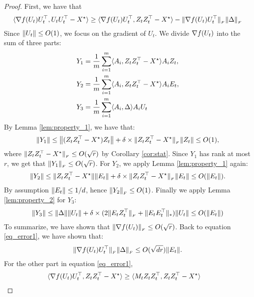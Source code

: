	\begin{proof}
		First, we have that
		\begin{align}
			\langle\nabla f(U_t) U_t^{\top}, U_tU_t^{\top} - {X}^\star\rangle
			\ge \langle\nabla f(U_t) U_t^{\top}, Z_tZ_t^{\top} - {X}^\star\rangle - \|\nabla f(U_t) U_t^{\top}\|_{_{F}} \|\Delta\|_{_{F}} \label{eq_error1}
		\end{align}
		Since $\|U_t\| \le O(1)$, we focus on the gradient of $U_t$.
		We divide $\nabla f(U_t)$ into the sum of three parts:
		\begin{align*}
			& Y_1 = \frac 1 m \sum_{i=1}^m \langle A_i, Z_tZ_t^{\top} - {X}^\star\rangle A_i Z_t, \\
			& Y_2 = \frac 1 m \sum_{i=1}^m \langle A_i, Z_tZ_t^{\top} - {X}^\star\rangle A_i E_t, \\
			& Y_3 = \frac 1 m \sum_{i=1}^m \langle A_i, \Delta\rangle A_i U_t
		\end{align*}
		By Lemma \ref{lem:property_1}, we have that:
		\begin{align}
			\|Y_1\| \le \left\|(Z_tZ_t^{\top} - {X}^\star) Z_t\right\| + \delta \times \|Z_tZ_t^{\top} - {X}^\star\|_{_{F}} \|Z_t\| \le O(1),\label{eq:y_1}
		\end{align}
		where $\|Z_tZ_t^{\top} - {X}^\star\|_{_{F}} \le O(\sqrt r)$ by Corollary \ref{cor:stat}. Since $Y_1$ has rank at most $r$, we get that $\|Y_1\|_{_{F}} \le O(\sqrt r)$. For $Y_2$, we apply Lemma \ref{lem:property_1} again:
		\begin{align*}
			\|Y_2\| \le \|Z_tZ_t^{\top} - {X}^\star\| \|E_t\| + \delta \times \|Z_tZ_t^{\top} - {X}^\star\|_{_{F}} \|E_t\| \le O(\|E_t\|).
		\end{align*}
		By assumption $\|E_t\| \le 1 / d$, hence $\|Y_2\|_{_{F}} \le O(1)$.
		Finally we apply Lemma \ref{lem:property_2} for $Y_3$:
		\begin{align*}
			\|Y_3\| \le \|\Delta\| \|U_t\| + \delta \times (2\|E_tZ_t^{\top}\|_{_{F}} + \|E_tE_t^{\top}\|_{*}) \|U_t\| \le O(\|E_t\|)
		\end{align*}
		To summarize, we have shown that $\|\nabla f(U_t)\|_{_{F}} \le O(\sqrt r)$.
		Back to equation \eqref{eq_error1}, we have shown that:
		\begin{align*}
			\|\nabla f(U_t) U_t^{\top}\|_{_{F}} \|\Delta\|_{_{F}} \le O(\sqrt{dr}) \|E_t\|.
		\end{align*}
						For the other part in equation \eqref{eq_error1},
		\begin{align*}
			\innerProduct{\cG(U_t)U_t^{\top}}{Z_tZ_t^{\top} - \bXg}
			&\ge \innerProduct{M_t Z_tZ_t^{\top}} {Z_tZ_t^{\top} - \bXg}

\end{align*}
\end{proof}
